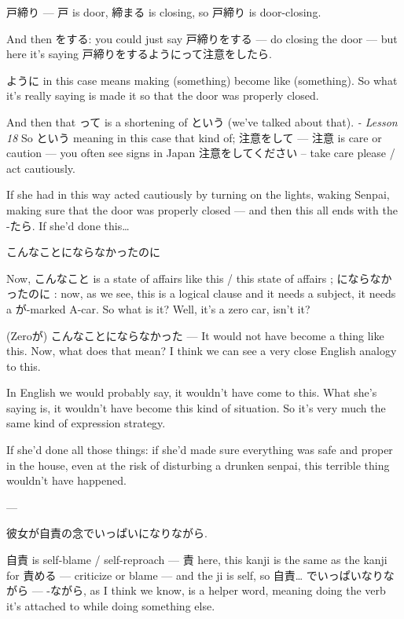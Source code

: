 戸締り --- 戸 is door, 締まる is closing, so 戸締り is door-closing.

And then をする: you could just say 戸締りをする --- do closing the door --- but here it's saying 戸締りをするようにって注意をしたら.

ように in this case means making (something) become like (something). So what it's really saying is made it so that the door was properly closed.

And then that って is a shortening of という (we've talked about that). {\em - Lesson 18} So という meaning in this case that kind of; 注意をして --- 注意 is care or caution --- you often see signs in Japan 注意をしてください -- take care please / act cautiously.

If she had in this way acted cautiously by turning on the lights, waking Senpai, making sure that the door was properly closed --- and then this all ends with the -たら. If she'd done this\ldots{}

こんなことにならなかったのに

{}

Now, こんなこと is a state of affairs like this / this state of affairs ; にならなかったのに : now, as we see, this is a logical clause and it needs a subject, it needs a が-marked A-car. So what is it? Well, it's a zero car, isn't it?

(Zeroが) こんなことにならなかった --- It would not have become a thing like this. Now, what does that mean? I think we can see a very close English analogy to this.

In English we would probably say, it wouldn't have come to this. What she's saying is, it wouldn't have become this kind of situation. So it's very much the same kind of expression strategy.

If she'd done all those things: if she'd made sure everything was safe and proper in the house, even at the risk of disturbing a drunken senpai, this terrible thing wouldn't have happened.

---

彼女が自責の念でいっぱいになりながら.

{}

自責 is self-blame / self-reproach --- 責 here, this kanji is the same as the kanji for 責める --- criticize or blame --- and the ji is self, so 自責\ldots{} でいっぱいなりながら --- -ながら, as I think we know, is a helper word, meaning doing the verb it's attached to while doing something else.

